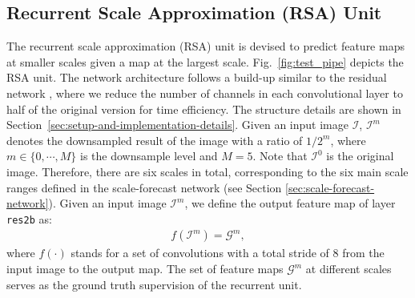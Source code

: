 \documentclass[10pt,twocolumn,letterpaper]{article}
\begin{document}
\subsection{Recurrent Scale Approximation (RSA) Unit}\label{sec:recurrent-scale-approximation-(rsa)-unit}
The recurrent scale approximation (RSA) unit is devised to predict feature maps at smaller scales given a map at the largest scale. Fig.~\ref{fig:test_pipe} depicts the %
RSA unit.
%
%
The network architecture follows a build-up similar to the residual network \cite{resNet}, where we reduce the number of channels in each convolutional layer to half of the original version for time efficiency. The structure details are shown in Section~\ref{sec:setup-and-implementation-details}.
Given an input image $ \mathcal{I}$, $\mathcal{I}^m$ denotes the downsampled result of the image with a ratio of $1/2^m$, where $m\in\{0, \cdots, M\}$ is the downsample level and $M=5$. Note that $\mathcal{I}^0$ is the original image. Therefore, there are  six scales in total, %
corresponding to the six main scale ranges defined in the scale-forecast network (see Section \ref{sec:scale-forecast-network}).
%
Given an input image $\mathcal{I}^m$, we define the output feature map of layer \texttt{res2b} as:
\begin{gather}
f( \mathcal{I} ^m ) = \mathcal{G} ^ m,
\end{gather}
where $f(\cdot)$ stands for a set of convolutions with a total stride of 8 from the input image to the output map. The set of feature maps $\mathcal{G} ^ m$ at different scales serves as the ground truth supervision of the recurrent unit.
\end{document}
